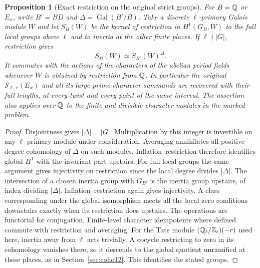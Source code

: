 \documentclass[a4paper,11pt]{article}
\newtheorem{proposition}{Proposition}[section]
\theoremstyle{definition}
\theoremstyle{remark}
\newcommand{\ZZ}{\mathbb Z}\newcommand{\ord}{\operatorname{ord}}
\numberwithin{equation}{section}
\begin{document}
\begin{proposition}[Exact restriction on the original strict groups]\leavevmode
\label{prop:strictdescent404}
For \(B=\mathbb Q\) or \(E_x\), write \(B'=BD\) and
\(\Delta=\operatorname{Gal}(B'/B)\). Take a discrete
\(\ell\)-primary Galois module \(W\) and let \(S_B(W)\) be the
kernel of restriction in \(H^1(G_B,W)\) to the full local
groups above \(\ell\) and to inertia at the other finite places.
If \(\ell\nmid |G|\), restriction gives
\[
                   S_B(W)\simeq S_{B'}(W)^\Delta .
\]
It commutes with the actions of the characters of the abelian
period fields whenever \(W\) is obtained by restriction from
\(\mathbb Q\). In particular the original \(\mathcal S_{\ell,r}(E_x)\)
and all its large-prime character summands are recovered
with their full lengths, at every twist and every point of the
same interval. The assertion also applies over \(\mathbb Q\) to the
finite and divisible character modules in the marked problem.
\end{proposition}
\begin{proof}
Disjointness gives \(|\Delta|=|G|\). Multiplication by this
integer is invertible on any \(\ell\)-primary module under
consideration. Averaging annihilates all positive-degree
cohomology of \(\Delta\) on such modules. Inflation--restriction
therefore identifies global \(H^1\) with the invariant part
upstairs. For full local groups the same argument gives
injectivity on restriction since the local degree divides
\(|\Delta|\). The intersection of a chosen inertia group with
\(G_{B'}\) is the inertia group upstairs, of index dividing
\(|\Delta|\). Inflation--restriction again gives injectivity.
A class corresponding under the global isomorphism meets
all the local zero conditions downstairs exactly when its
restriction does upstairs. The operations are functorial for
conjugation. Finite-level character idempotents where defined
commute with restriction and averaging. For the Tate module
\((\QQ_\ell/\ZZ_\ell)(-r)\) used here, inertia away from
\(\ell\) acts trivially. A cocycle restricting to zero in its
cohomology vanishes there, so it descends to the global
quotient unramified at these places, as in
Section~\ref{sec:coho12}. This identifies the stated groups.
\end{proof}
\end{document}
